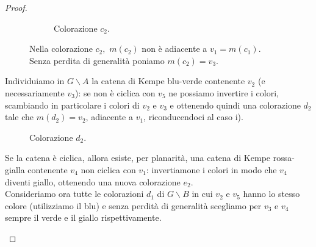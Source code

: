 \documentclass[a4paper,12pt,titlepage]{report}
\begin{document}
\begin{proof}
\begin{figure}[H]
\begin{subfigure}{0.3\textwidth}
    			\caption{Colorazione $c_2$.}
    		\end{subfigure}
    		\vspace{0.5cm}
    		\caption{Nella colorazione $c_2, $ $m(c_2)$ non è adiacente a $v_1 = m(c_1)$. \\Senza perdita di generalità poniamo $m(c_2) = v_3$.}
    	\end{figure}
    	\noindent Individuiamo in $G \smallsetminus A$ la catena di Kempe blu-verde contenente $v_2$ (e necessariamente $v_3$): se non è ciclica con $v_5$ ne possiamo invertire i colori, scambiando in particolare i colori di $v_2$ e $v_3$ e ottenendo quindi una colorazione $d_2$ tale che $m(d_2) = v_2$, adiacente a $v_1$, riconducendoci al caso i).
    	\begin{figure}[H]
    		\centering
    		\caption{Colorazione $d_2$.}
    	\end{figure}
    	\noindent Se la catena è ciclica, allora esiste, per planarità, una catena di Kempe rossa-gialla contenente $v_4$ non ciclica con $v_1$: invertiamone i colori in modo che $v_4$ diventi giallo, ottenendo una nuova colorazione $e_2$.
    	\\Consideriamo ora tutte le colorazioni $d_1$ di $G \smallsetminus B$ in cui $v_2$ e $v_5$ hanno lo stesso colore (utilizziamo il blu) e senza perdità di generalità scegliamo per $v_3$ e $v_4$ sempre il verde e il giallo rispettivamente.
    	\begin{figure}[H]
    		\centering
    		\begin{subfigure}{0.3\textwidth}
    			\centering
\end{subfigure}
\end{figure}
\end{proof}
\end{document}
